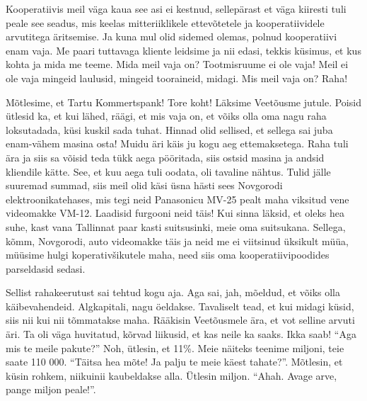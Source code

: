 
Kooperatiivis meil väga kaua see asi ei kestnud,  sellepärast et väga kiiresti tuli peale see seadus, mis keelas mitteriiklikele ettevõtetele ja kooperatiividele arvutitega äritsemise. Ja kuna mul olid sidemed olemas, polnud kooperatiivi enam vaja. Me paari tuttavaga kliente leidsime ja nii edasi, tekkis küsimus, et kus kohta ja mida me teeme. Mida meil vaja on? Tootmisruume ei ole vaja! Meil ei ole vaja mingeid laulusid, mingeid tooraineid, midagi. Mis meil vaja on? Raha!

Mõtlesime, et Tartu Kommertspank! Tore koht! Läksime Veetõusme jutule. Poisid ütlesid ka, et kui lähed, räägi, et mis vaja on, et võiks olla oma nagu raha loksutadada, küsi kuskil sada tuhat. Hinnad olid sellised, et sellega sai juba enam-vähem masina osta! Muidu äri käis ju kogu aeg ettemaksetega. Raha tuli ära ja siis sa võisid teda tükk aega pööritada, siis ostsid  masina ja andsid kliendile kätte. See, et kuu aega tuli oodata, oli tavaline nähtus. Tulid jälle suuremad summad, siis meil olid käsi üsna hästi sees Novgorodi elektroonikatehases, mis tegi neid Panasonicu MV-25 pealt maha viksitud vene videomakke VM-12. Laadisid furgooni neid täis! Kui sinna läksid, et oleks hea suhe, kast vana Tallinnat paar kasti suitsusinki, meie oma suitsukana. Sellega, kõmm, Novgorodi, auto videomakke täis ja neid me ei viitsinud üksikult müüa, müüsime hulgi koperativšikutele maha, need siis oma kooperatiivipoodides parseldasid sedasi. 

Sellist rahakeerutust sai tehtud kogu aja. Aga sai, jah, mõeldud, et võiks olla käibevahendeid. Algkapitali, nagu öeldakse. Tavaliselt tead, et kui  midagi küsid, siis nii kui nii tõmmatakse maha. Rääkisin Veetõusmele ära, et vot selline arvuti äri. Ta oli väga huvitatud, kõrvad liikusid, et kas neile ka saaks. Ikka saab! \enquote{Aga mis te meile pakute?} Noh, ütlesin, et 11\%. Meie näiteks teenime miljoni, teie saate 110 000. \enquote{Täitsa hea mõte! Ja palju te meie käest tahate?}. Mõtlesin, et küsin rohkem, niikuinii kaubeldakse alla. Ütlesin miljon. \enquote{Ahah. Avage arve, pange miljon peale!}.

